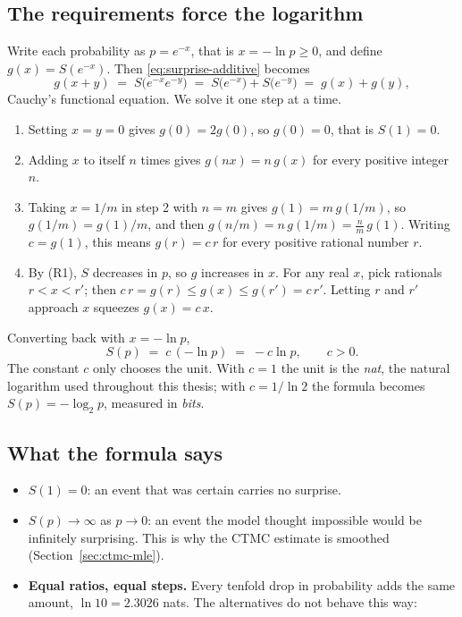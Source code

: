 \subsection{The requirements force the logarithm}
Write each probability as $p = e^{-x}$, that is $x = -\ln p \ge 0$, and define
$g(x) = S(e^{-x})$. Then \eqref{eq:surprise-additive} becomes
\[
g(x + y) \;=\; S\bigl(e^{-x}e^{-y}\bigr) \;=\; S\bigl(e^{-x}\bigr) + S\bigl(e^{-y}\bigr)
\;=\; g(x) + g(y),
\]
Cauchy's functional equation. We solve it one step at a time.
\begin{enumerate}
\item Setting $x = y = 0$ gives $g(0) = 2g(0)$, so $g(0) = 0$, that is $S(1) = 0$.
\item Adding $x$ to itself $n$ times gives $g(nx) = n\,g(x)$ for every positive integer $n$.
\item Taking $x = 1/m$ in step 2 with $n = m$ gives $g(1) = m\,g(1/m)$, so
$g(1/m) = g(1)/m$, and then $g(n/m) = n\,g(1/m) = \tfrac{n}{m}\,g(1)$. Writing $c = g(1)$,
this means $g(r) = c\,r$ for every positive rational number $r$.
\item By (R1), $S$ decreases in $p$, so $g$ increases in $x$. For any real $x$, pick
rationals $r < x < r'$; then $c\,r = g(r) \le g(x) \le g(r') = c\,r'$. Letting $r$ and $r'$
approach $x$ squeezes $g(x) = c\,x$.
\end{enumerate}
Converting back with $x = -\ln p$,
\begin{equation}
S(p) \;=\; c\,(-\ln p) \;=\; -c \ln p, \qquad c > 0 .
\label{eq:surprise-log}
\end{equation}
The constant $c$ only chooses the unit. With $c = 1$ the unit is the \emph{nat}, the natural
logarithm used throughout this thesis; with $c = 1/\ln 2$ the formula becomes
$S(p) = -\log_2 p$, measured in \emph{bits}.

\subsection{What the formula says}
\begin{itemize}
\item $S(1) = 0$: an event that was certain carries no surprise.
\item $S(p) \to \infty$ as $p \to 0$: an event the model thought impossible would be infinitely
surprising. This is why the CTMC estimate is smoothed (Section~\ref{sec:ctmc-mle}).
\item \textbf{Equal ratios, equal steps.} Every tenfold drop in probability adds the same
amount, $\ln 10 = 2.3026$ nats. The alternatives do not behave this way:
\end{itemize}

